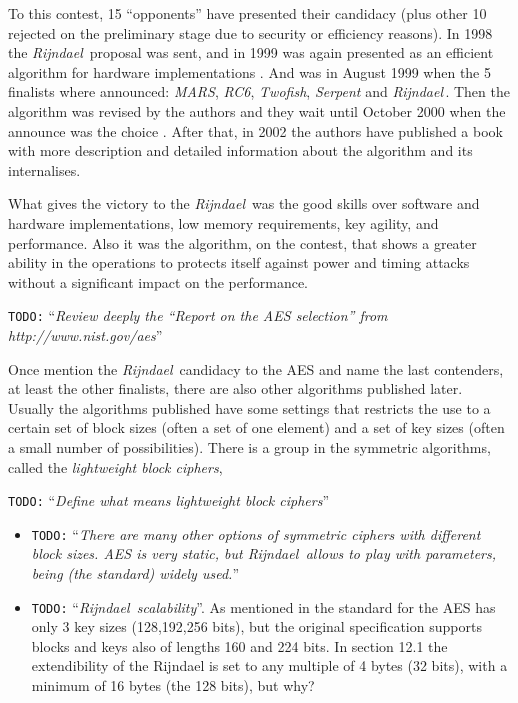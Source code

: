 \documentclass[10pt,a4paper,twoside]{llncs}
\newcommand{\todo}[1]{\texttt{\color{red}TODO:} ``\emph{#1}''}
\newcommand{\rijndael}{\emph{Rijndael}}
\begin{document}
To this contest, 15 ``opponents'' have presented their candidacy (plus other 10 rejected on the preliminary stage due to security or efficiency reasons). In 1998 the \rijndael\, proposal \cite{Daemen98aesproposal:} was sent, and in 1999 was again presented as an efficient algorithm for hardware implementations \cite{Daemen:1998:BCR:646692.759487}. And was in August 1999 when the 5 finalists where announced: \emph{MARS}, \emph{RC6}, \emph{Twofish}, \emph{Serpent} and \rijndael\,. Then the algorithm was revised by the authors \cite{Daemen01aes-ammended} and they wait until October 2000 when the announce was the choice  \cite{AES-FIPS}. After that, in 2002 the authors have published a book \cite{Daemen:2002:DR:560131} with more description and detailed information about the algorithm and its internalises.

What gives the victory to the \rijndael\, was the good skills over software and hardware implementations, low memory requirements, key agility, and performance. Also it was the algorithm, on the contest, that shows a greater ability in the operations to protects itself against power and timing attacks without a significant impact on the performance.

\todo{Review deeply the ``Report on the AES selection'' from http://www.nist.gov/aes}


Once mention the \rijndael\, candidacy to the AES and name the last contenders, at least the other finalists, there are also other algorithms published later. Usually the algorithms published have some settings that restricts the use to a certain set of block sizes (often a set of one element) and a set of key sizes (often a small number of possibilities). There is a group in the symmetric algorithms, called the \emph{lightweight block ciphers}, 

\todo{Define what means \emph{lightweight block ciphers}}

\begin{itemize}
 \item \todo{There are many other options of symmetric ciphers with different block sizes. AES is very static, but \rijndael\, allows to play with parameters, being (the standard) widely used.}
 \item \todo{\rijndael\, scalability}. As mentioned in \cite{Daemen01aes-ammended} the standard for the AES has only 3 key sizes (128,192,256 bits), but the original specification supports blocks and keys also of lengths 160 and 224 bits. In section 12.1 the extendibility of the Rijndael is set to any multiple of 4 bytes (32 bits), with a minimum of 16 bytes (the 128 bits), but why?
\end{itemize}
\end{document}
